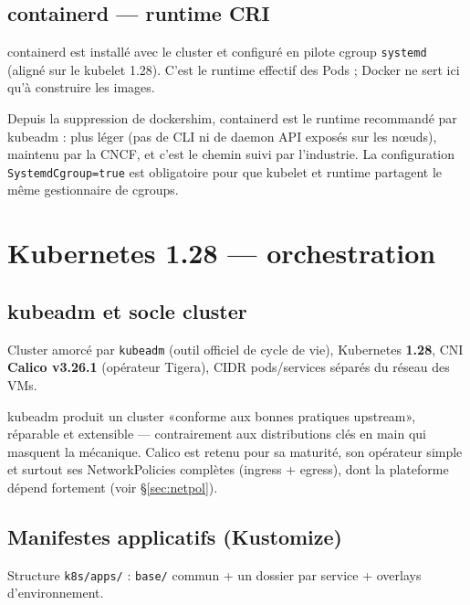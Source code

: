 \documentclass[11pt,a4paper]{article}
\begin{document}
\subsection{containerd --- runtime CRI}
containerd est installé avec le cluster et configuré en pilote cgroup \texttt{systemd} (aligné sur le kubelet 1.28). C'est le runtime effectif des Pods ; Docker ne sert ici qu'à construire les images.

\begin{whybox}
Depuis la suppression de dockershim, containerd est le runtime recommandé par kubeadm : plus léger (pas de CLI ni de daemon API exposés sur les nœuds), maintenu par la CNCF, et c'est le chemin suivi par l'industrie. La configuration \texttt{SystemdCgroup=true} est obligatoire pour que kubelet et runtime partagent le même gestionnaire de cgroups.
\end{whybox}

\section{Kubernetes 1.28 --- orchestration}

\subsection{kubeadm et socle cluster}
Cluster amorcé par \texttt{kubeadm} (outil officiel de cycle de vie), Kubernetes \textbf{1.28}, CNI \textbf{Calico v3.26.1} (opérateur Tigera), CIDR pods/services séparés du réseau des VMs.

\begin{whybox}
kubeadm produit un cluster «conforme aux bonnes pratiques upstream», réparable et extensible --- contrairement aux distributions clés en main qui masquent la mécanique. Calico est retenu pour sa maturité, son opérateur simple et surtout ses NetworkPolicies complètes (ingress + egress), dont la plateforme dépend fortement (voir \S\ref{sec:netpol}).
\end{whybox}

\subsection{Manifestes applicatifs (Kustomize)}
Structure \texttt{k8s/apps/} : \texttt{base/} commun + un dossier par service + overlays d'environnement.
\end{document}
